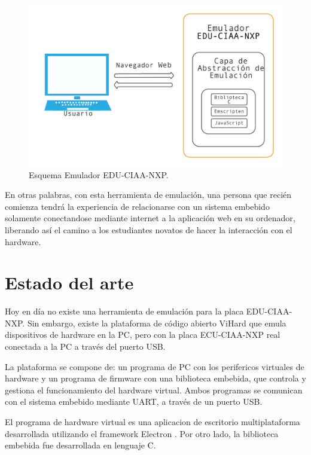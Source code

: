 \begin{figure}[ht]
	\centering
	\includegraphics[scale=.60]{./Figures/EsquemaEmulador.png}
	\caption{Esquema Emulador EDU-CIAA-NXP.}
	\label{fig:EsquemaEmulador}
\end{figure}

En otras palabras, con esta herramienta de emulación, una persona que recién comienza tendrá la experiencia de relacionarse con un sistema embebido solamente conectandose mediante internet a la aplicación web en su ordenador, liberando así el camino a los estudiantes novatos de hacer la interacción con el hardware.

\section{Estado del arte}

Hoy en día no existe una herramienta de emulación para la placa EDU-CIAA-NXP. Sin embargo, existe la plataforma de código abierto ViHard \citep{ViHard} que emula dispositivos de hardware en la PC, pero con la placa ECU-CIAA-NXP real conectada a la PC a través del puerto USB. 

La plataforma se compone de: un programa de PC con los perifericos virtuales de hardware y un programa de firmware con una biblioteca embebida, que controla y gestiona el funcionamiento del hardware virtual. Ambos programas se comunican con el sistema embebido mediante UART, a través de un puerto USB.

El programa de hardware virtual es una aplicacion de escritorio multiplataforma desarrollada utilizando el framework Electron \citep{Electron}. Por otro lado, la biblioteca embebida fue desarrollada en lenguaje C. 

